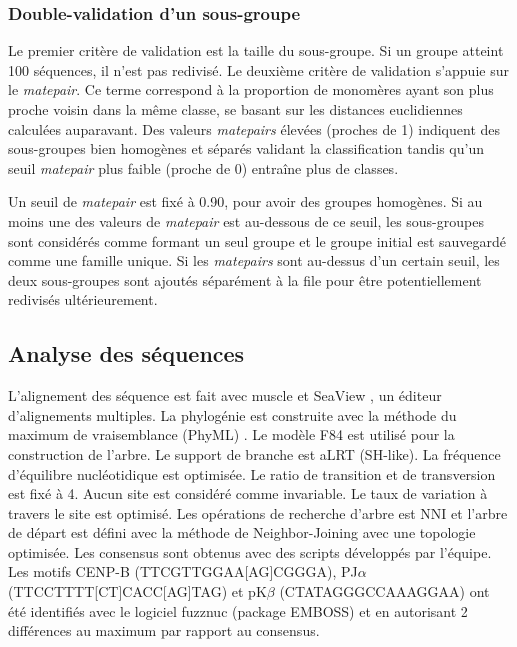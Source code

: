 \documentclass[12pt,a4paper]{article}
\begin{document}
	\subsubsection{Double-validation d'un sous-groupe}
Le premier critère de validation est la taille du sous-groupe. Si un groupe atteint 100 séquences, il n'est pas redivisé. Le deuxième critère de validation s'appuie sur le \textit{matepair}. Ce terme correspond à la proportion de monomères ayant son plus proche voisin dans la même classe, se basant sur les distances euclidiennes calculées auparavant. Des valeurs \textit{matepairs} élevées (proches de 1) indiquent des sous-groupes bien homogènes et séparés validant la classification tandis qu’un seuil \textit{matepair} plus faible (proche de 0) entraîne plus de classes.

Un seuil de \textit{matepair} est fixé à 0.90, pour avoir des groupes homogènes. Si au moins une des valeurs de \textit{matepair} est au-dessous de ce seuil, les sous-groupes sont considérés comme formant un seul groupe et le groupe initial est sauvegardé comme une famille unique. Si les \textit{matepairs} sont au-dessus d’un certain seuil, les deux sous-groupes sont ajoutés séparément à la file pour être potentiellement redivisés ultérieurement.

	\subsection{Analyse des séquences}
L'alignement des séquence est fait avec muscle \cite{Edgar2004} et SeaView \cite{Gouy2009}, un éditeur d'alignements multiples. 
La phylogénie est construite avec la méthode du maximum de vraisemblance (PhyML) \cite{Guindon2009a}. Le modèle F84 est utilisé pour la construction de l'arbre. Le support de branche est aLRT (SH-like). La fréquence d'équilibre nucléotidique est optimisée. Le ratio de transition et de transversion est fixé à 4. Aucun site est considéré comme invariable. Le taux de variation à travers le site est optimisé. Les opérations de recherche d'arbre est NNI et l'arbre de départ est défini avec la méthode de Neighbor-Joining \cite{Saitou1987} avec une topologie optimisée.
Les consensus sont obtenus avec des scripts développés par l'équipe. Les motifs CENP-B (TTCGTTGGAA[AG]CGGGA), PJ$\alpha$ (TTCCTTTT[CT]CACC[AG]TAG) et pK$\beta$ (CTATAGGGCCAAAGGAA) ont été identifiés avec le logiciel fuzznuc (package EMBOSS) \cite{Rice2000} et en autorisant 2 différences au maximum par rapport au consensus.

\end{document}
